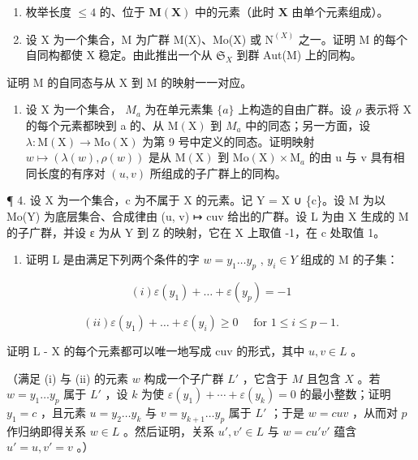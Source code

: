 \BourbakiExercisesSection

\begin{enumerate}
\def\labelenumi{\arabic{enumi}.}
\item
  枚举长度 \(\leqslant 4\) 的、位于 \(\mathbf{M}(\mathbf{X})\) 中的元素（此时 \(\mathbf{X}\) 由单个元素组成）。
\item
  设 X 为一个集合，M 为广群 M(X)、Mo(X) 或 \(\mathrm{N}^{(X)}\) 之一。证明 M 的每个自同构都使 X 稳定。由此推出一个从 \(\mathfrak{S}_{X}\) 到群 Aut(M) 上的同构。
\end{enumerate}

证明 M 的自同态与从 X 到 M 的映射一一对应。

\begin{enumerate}
\def\labelenumi{\arabic{enumi}.}
\setcounter{enumi}{2}
\tightlist
\item
  设 X 为一个集合， \(M_{a}\) 为在单元素集 \(\{a\}\) 上构造的自由广群。设 \(\rho\) 表示将 X 的每个元素都映到 a 的、从 \(\mathrm{M}(\mathrm{X})\) 到 \(M_{a}\) 中的同态；另一方面，设 \(\lambda: \mathrm{M}(\mathrm{X}) \to \mathrm{Mo}(\mathrm{X})\) 为第 9 号中定义的同态。证明映射 \(w \mapsto (\lambda(w), \rho(w))\) 是从 \(\mathrm{M}(\mathrm{X})\) 到 \(\mathrm{Mo}(\mathrm{X}) \times \mathrm{M}_{a}\) 的由 u 与 v 具有相同长度的有序对 \((u, v)\) 所组成的子广群上的同构。
\end{enumerate}

¶ 4. 设 X 为一个集合，c 为不属于 X 的元素。记 Y = X ∪ \{c\}。设 M 为以 Mo(Y) 为底层集合、合成律由 (u, v) ↦ cuv 给出的广群。设 L 为由 X 生成的 M 的子广群，并设 ε 为从 Y 到 Z 的映射，它在 X 上取值 -1，在 c 处取值 1。

\begin{enumerate}
\def\labelenumi{(\alph{enumi})}
\tightlist
\item
  证明 L 是由满足下列两个条件的字 \(w = y_{1} \ldots y_{p}\) , \(y_{i} \in Y\) 组成的 M 的子集：
\end{enumerate}

\[
(i) \varepsilon (y _ {1}) + \dots + \varepsilon (y _ {p}) = - 1
\]

\[
(ii) \varepsilon \left(y _ {1}\right) + \dots + \varepsilon \left(y _ {i}\right) \geqslant 0 \quad \text { for } 1 \leqslant i \leqslant p - 1.
\]

证明 L - X 的每个元素都可以唯一地写成 cuv 的形式，其中 \(u, v \in L\) 。

（满足 (i) 与 (ii) 的元素 \(w\) 构成一个子广群 \(L'\) ，它含于 \(M\) 且包含 \(X\) 。若 \(w = y_1 \ldots y_p\) 属于 \(L'\) ，设 \(k\) 为使 \(\varepsilon(y_1) + \cdots + \varepsilon(y_k) = 0\) 的最小整数；证明 \(y_1 = c\) ，且元素 \(u = y_2 \ldots y_k\) 与 \(v = y_{k+1} \ldots y_p\) 属于 \(L'\) ；于是 \(w = cuv\) ，从而对 \(p\) 作归纳即得关系 \(w \in L\) 。然后证明，关系 \(u', v' \in L\) 与 \(w = cu'v'\) 蕴含 \(u' = u, v' = v\) 。）

